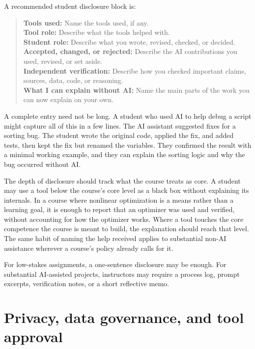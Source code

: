 \documentclass{SIAMbook2023}
\begin{document}
A recommended student disclosure block is:

\begin{quote}
\textbf{Tools used:} Name the tools used, if any.\\
\textbf{Tool role:} Describe what the tools helped with.\\
\textbf{Student role:} Describe what you wrote, revised, checked, or decided.\\
\textbf{Accepted, changed, or rejected:} Describe the AI contributions you used, revised, or set aside.\\
\textbf{Independent verification:} Describe how you checked important claims, sources, data, code, or reasoning.\\
\textbf{What I can explain without AI:} Name the main parts of the work you can now explain on your own.
\end{quote}

A complete entry need not be long. A student who used AI to help debug a script might capture all of this in a few lines. The AI assistant suggested fixes for a sorting bug. The student wrote the original code, applied the fix, and added tests, then kept the fix but renamed the variables. They confirmed the result with a minimal working example, and they can explain the sorting logic and why the bug occurred without AI.

The depth of disclosure should track what the course treats as core. A student may use a tool below the course's core level as a black box without explaining its internals. In a course where nonlinear optimization is a means rather than a learning goal, it is enough to report that an optimizer was used and verified, without accounting for how the optimizer works. Where a tool touches the core competence the course is meant to build, the explanation should reach that level. The same habit of naming the help received applies to substantial non-AI assistance wherever a course's policy already calls for it.

For low-stakes assignments, a one-sentence disclosure may be enough. For substantial AI-assisted projects, instructors may require a process log, prompt excerpts, verification notes, or a short reflective memo.

\section{Privacy, data governance, and tool approval}
\label{u:sec:privacy}%
\end{document}
